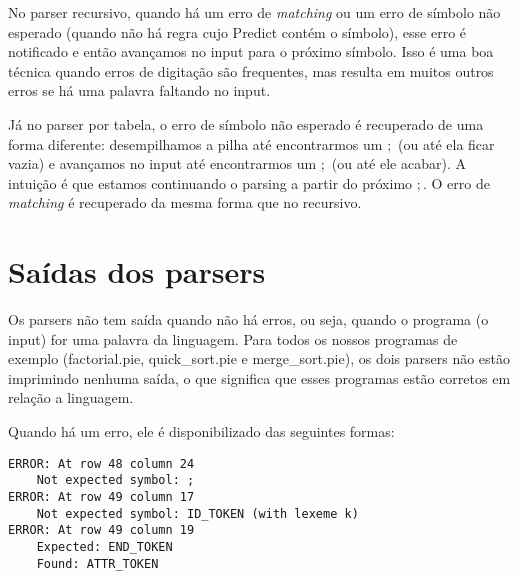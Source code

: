 No parser recursivo, quando há um erro de \textit{matching} ou um erro de símbolo não esperado (quando não há regra cujo Predict contém o símbolo), esse erro é notificado e então avançamos no input para o próximo símbolo. Isso é uma boa técnica quando erros de digitação são frequentes, mas resulta em muitos outros erros se há uma palavra faltando no input. 

Já no parser por tabela, o erro de símbolo não esperado é recuperado de uma forma diferente: desempilhamos a pilha até encontrarmos um $;$ (ou até ela ficar vazia) e avançamos no input até encontrarmos um $;$ (ou até ele acabar). A intuição é que estamos continuando o parsing a partir do próximo $;$. O erro de \textit{matching} é recuperado da mesma forma que no recursivo.

\section{Saídas dos parsers}
Os parsers não tem saída quando não há erros, ou seja, quando o programa (o input) for uma palavra da linguagem. Para todos os nossos programas de exemplo (factorial.pie, quick\_sort.pie e merge\_sort.pie), os dois parsers não estão imprimindo nenhuma saída, o que significa que esses programas estão corretos em relação a linguagem.

Quando há um erro, ele é disponibilizado das seguintes formas:
\vspace{0.5cm}

\begin{verbatim}
ERROR: At row 48 column 24 
    Not expected symbol: ;
ERROR: At row 49 column 17 
    Not expected symbol: ID_TOKEN (with lexeme k)
ERROR: At row 49 column 19
    Expected: END_TOKEN
    Found: ATTR_TOKEN
\end{verbatim} 


